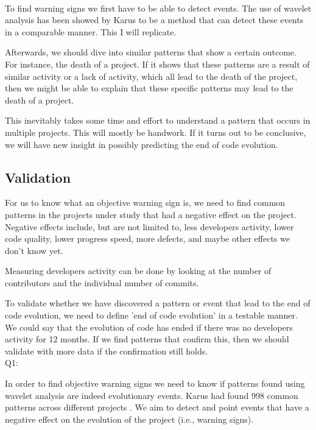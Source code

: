 \paragraph{}
To find warning signs we first have to be able to detect events. The use
of wavelet analysis has been showed by Karus \cite{karus2013} to be a method
that can detect these events in a comparable manner. This I will replicate.

Afterwards, we should dive into similar patterns that show a certain outcome.
For instance, the death of a project. If it shows that these patterns are a
result of similar activity or a lack of activity, which all lead to the death of
the project, then we might be able to explain that these specific patterns may
lead to the death of a project.

This inevitably takes some time and effort to understand a pattern that occurs
in multiple projects. This will mostly be handwork. If it turns out to be
conclusive, we will have new insight in possibly predicting the end of code
evolution.

\subsection{Validation}
For us to know what an objective warning sign is, we need to find common
patterns in the projects under study that had a negative effect on the project.
Negative effects include, but are not limited to, less developers activity,
lower code quality, lower progress speed, more defects, and maybe other effects
we don't know yet.

Measuring developers activity can be done by looking at the number of
contributors and the individual number of commits.

To validate whether we have discovered a pattern or event that lead to the end
of code evolution, we need to define 'end of code evolution' in a testable
manner. We could say that the evolution of code has ended if there was no
developers activity for 12 months. If we find patterns that confirm this, then
we should validate with more data if the confirmation still holds.
\\

\noindent
Q1: \emph{\subQuestionOne}

In order to find objective warning signs we need to know if patterns found using
wavelet analysis are indeed evolutionary events. Karus had found 998 common
patterns across different projects \cite{karus2013}.
We aim to detect and point events that have a negative effect on the evolution
of the project (i.e., warning signs).


